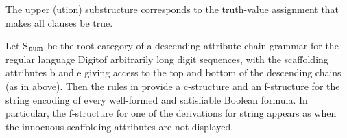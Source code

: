 \documentclass[output=paper,hidelinks]{langscibook}
\begin{document}
\ea\label{recsolution}
\z

\noindent  The upper (ution) substructure corresponds to the truth-value assignment  that makes all clauses be true. 

Let S$_{\mbox{\scriptsize\rm num}}$ be the root category of a descending attribute-chain grammar for the regular language Digit\kplus of arbitrarily long digit sequences, with the scaffolding attributes \attr b and \attr e giving access to the top and bottom of the descending chains (as in  above).  Then the rules in  provide a c-structure and an f-structure for the string encoding of every well-formed and satisfiable Boolean formula. In particular, the f-structure for one of the derivations for string  appears as  when the innocuous scaffolding attributes are not displayed. 
\end{document}
